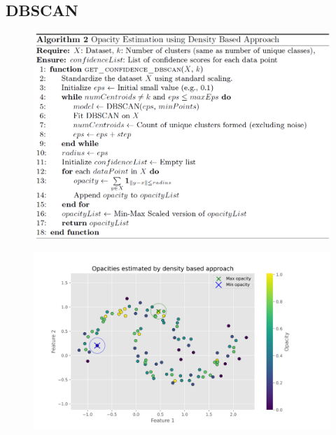 \documentclass[aspectratio=169]{beamer}
\begin{document}
\subsection{{\rm DBSCAN}}
\begin{frame}
\begin{figure}
    \centering
    \includegraphics[width=0.75\linewidth]{../../fig/alg_dbscan_opacity.png}
    \label{fig:alg_dbscan}
\end{figure}
    
\end{frame}


\begin{frame}
\begin{figure}
    \centering
    \includegraphics[width=0.75\linewidth]{../../fig/denisty_opactiy.png}
    \label{fig:density_opacity}
\end{figure}
\end{frame}
\end{document}
